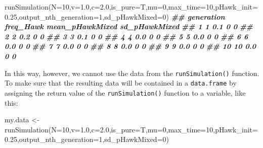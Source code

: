 \documentclass[
]{book}
\newenvironment{Shaded}{\begin{snugshade}}{\end{snugshade}}
\newcommand{\AttributeTok}[1]{\textcolor[rgb]{0.77,0.63,0.00}{#1}}
\newcommand{\DecValTok}[1]{\textcolor[rgb]{0.00,0.00,0.81}{#1}}
\newcommand{\DocumentationTok}[1]{\textcolor[rgb]{0.56,0.35,0.01}{\textbf{\textit{#1}}}}
\newcommand{\FloatTok}[1]{\textcolor[rgb]{0.00,0.00,0.81}{#1}}
\newcommand{\FunctionTok}[1]{\textcolor[rgb]{0.00,0.00,0.00}{#1}}
\newcommand{\NormalTok}[1]{#1}
\newcommand{\OtherTok}[1]{\textcolor[rgb]{0.56,0.35,0.01}{#1}}
\begin{document}
\begin{Shaded}
\begin{Highlighting}[]
\FunctionTok{runSimulation}\NormalTok{(}\AttributeTok{N=}\DecValTok{10}\NormalTok{,}\AttributeTok{v=}\FloatTok{1.0}\NormalTok{,}\AttributeTok{c=}\FloatTok{2.0}\NormalTok{,}\AttributeTok{is\_pure=}\NormalTok{T,}\AttributeTok{mu=}\DecValTok{0}\NormalTok{,}\AttributeTok{max\_time=}\DecValTok{10}\NormalTok{,}\AttributeTok{pHawk\_init=}\FloatTok{0.25}\NormalTok{,}\AttributeTok{output\_nth\_generation=}\DecValTok{1}\NormalTok{,}\AttributeTok{sd\_pHawkMixed=}\DecValTok{0}\NormalTok{)}
\DocumentationTok{\#\#    generation freq\_Hawk mean\_pHawkMixed sd\_pHawkMixed}
\DocumentationTok{\#\# 1           1       0.1               0             0}
\DocumentationTok{\#\# 2           2       0.2               0             0}
\DocumentationTok{\#\# 3           3       0.1               0             0}
\DocumentationTok{\#\# 4           4       0.0               0             0}
\DocumentationTok{\#\# 5           5       0.0               0             0}
\DocumentationTok{\#\# 6           6       0.0               0             0}
\DocumentationTok{\#\# 7           7       0.0               0             0}
\DocumentationTok{\#\# 8           8       0.0               0             0}
\DocumentationTok{\#\# 9           9       0.0               0             0}
\DocumentationTok{\#\# 10         10       0.0               0             0}
\end{Highlighting}
\end{Shaded}

In this way, however, we cannot use the data from the \texttt{runSimulation()} function. To make sure that the resulting data will be contained in a \texttt{data.frame} by assigning the return value of the \texttt{runSimulation()} function to a variable, like this:

\begin{Shaded}
\begin{Highlighting}[]
\NormalTok{my.data }\OtherTok{\textless{}{-}} \FunctionTok{runSimulation}\NormalTok{(}\AttributeTok{N=}\DecValTok{10}\NormalTok{,}\AttributeTok{v=}\FloatTok{1.0}\NormalTok{,}\AttributeTok{c=}\FloatTok{2.0}\NormalTok{,}\AttributeTok{is\_pure=}\NormalTok{T,}\AttributeTok{mu=}\DecValTok{0}\NormalTok{,}\AttributeTok{max\_time=}\DecValTok{10}\NormalTok{,}\AttributeTok{pHawk\_init=}\FloatTok{0.25}\NormalTok{,}\AttributeTok{output\_nth\_generation=}\DecValTok{1}\NormalTok{,}\AttributeTok{sd\_pHawkMixed=}\DecValTok{0}\NormalTok{)}
\end{Highlighting}
\end{Shaded}
\end{document}

